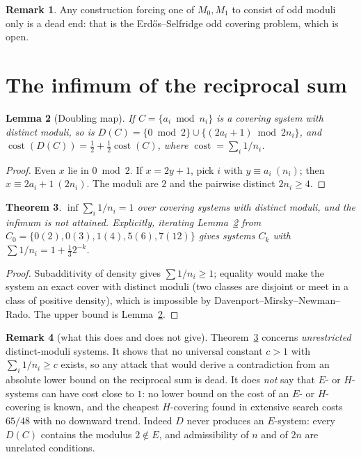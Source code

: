 \documentclass[11pt]{article}
\newtheorem{theorem}{Theorem}
\newtheorem{lemma}[theorem]{Lemma}
\theoremstyle{definition}
\newtheorem{remark}[theorem]{Remark}
\begin{document}
\begin{remark}
Any construction forcing one of $M_0,M_1$ to consist of odd moduli only is a dead end: that is the
Erd\H{o}s--Selfridge odd covering problem, which is open.
\end{remark}

\section{The infimum of the reciprocal sum}

\begin{lemma}[Doubling map]\label{lem:double}
If $C=\{a_i\bmod n_i\}$ is a covering system with distinct moduli, so is
$D(C)=\{0\bmod2\}\cup\{(2a_i+1)\bmod 2n_i\}$, and
$\operatorname{cost}(D(C))=\tfrac12+\tfrac12\operatorname{cost}(C)$, where
$\operatorname{cost}=\sum_i 1/n_i$.
\end{lemma}

\begin{proof}
Even $x$ lie in $0\bmod 2$. If $x=2y+1$, pick $i$ with $y\equiv a_i\ (n_i)$; then
$x\equiv 2a_i+1\ (2n_i)$. The moduli are $2$ and the pairwise distinct $2n_i\ge4$.
\end{proof}

\begin{theorem}\label{thm:inf}
$\inf\sum_i 1/n_i=1$ over covering systems with distinct moduli, and the infimum is not attained.
Explicitly, iterating Lemma~\ref{lem:double} from $C_0=\{0(2),0(3),1(4),5(6),7(12)\}$ gives systems
$C_k$ with $\sum 1/n_i=1+\tfrac13 2^{-k}$.
\end{theorem}

\begin{proof}
Subadditivity of density gives $\sum 1/n_i\ge1$; equality would make the system an exact cover
with distinct moduli (two classes are disjoint or meet in a class of positive density), which is
impossible by Davenport--Mirsky--Newman--Rado. The upper bound is Lemma~\ref{lem:double}.
\end{proof}

\begin{remark}[what this does and does not give]\label{rem:budget}
Theorem~\ref{thm:inf} concerns \emph{unrestricted} distinct-moduli systems. It shows that no
universal constant $c>1$ with $\sum_i 1/n_i\ge c$ exists, so any attack that would derive a
contradiction from an absolute lower bound on the reciprocal sum is dead. It does \emph{not} say
that $E$- or $H$-systems can have cost close to $1$: no lower bound on the cost of an $E$- or
$H$-covering is known, and the cheapest $H$-covering found in extensive search costs $65/48$ with
no downward trend. Indeed $D$ never produces an $E$-system: every $D(C)$ contains the modulus
$2\notin E$, and admissibility of $n$ and of $2n$ are unrelated conditions.
\end{remark}
\end{document}
